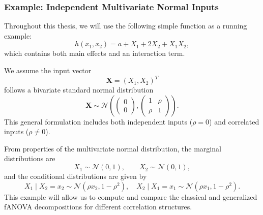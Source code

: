 \subsubsection{Example: Independent Multivariate Normal Inputs}

Throughout this thesis, we will use the following simple function as a running example:
\[
h(x_1, x_2) = a + X_1 + 2X_2 + X_1 X_2,
\]
which contains both main effects and an interaction term. 

We assume the input vector 
\[
\boldsymbol{X} = (X_1, X_2)^T
\]
follows a bivariate standard normal distribution
\[
\boldsymbol{X} \sim \mathcal{N}\!\left(
\begin{pmatrix}0 \\ 0\end{pmatrix},
\begin{pmatrix}
1 & \rho \\ 
\rho & 1
\end{pmatrix}
\right).
\]
This general formulation includes both independent inputs ($\rho = 0$) and correlated inputs ($\rho \neq 0$).

From properties of the multivariate normal distribution, the marginal distributions are
\[
X_1 \sim \mathcal{N}(0,1), \qquad X_2 \sim \mathcal{N}(0,1),
\]
and the conditional distributions are given by
\[
X_1 \mid X_2=x_2 \sim \mathcal{N}(\rho x_2, 1-\rho^2), \quad
X_2 \mid X_1=x_1 \sim \mathcal{N}(\rho x_1, 1-\rho^2).
\]
This example will allow us to compute and compare the classical and generalized fANOVA decompositions for different correlation structures.\par


